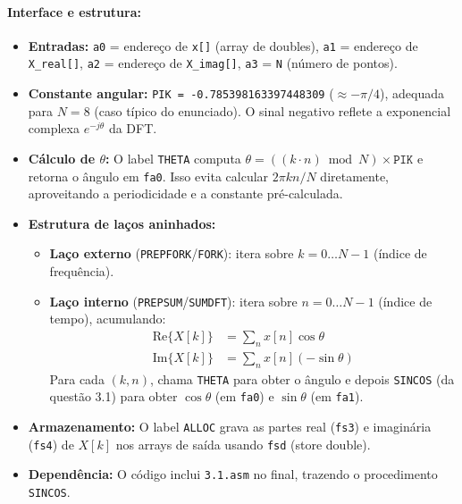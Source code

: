 \documentclass[12pt,a4paper]{article}
\begin{document}
\paragraph{Interface e estrutura:}
\begin{itemize}
  \item \textbf{Entradas:} \texttt{a0} = endereço de \texttt{x[]} (array de doubles), \texttt{a1} = endereço de \texttt{X\_real[]}, \texttt{a2} = endereço de \texttt{X\_imag[]}, \texttt{a3} = \texttt{N} (número de pontos).
  \item \textbf{Constante angular:} \texttt{PIK = -0.785398163397448309} ($\approx -\pi/4$), adequada para $N=8$ (caso típico do enunciado). O sinal negativo reflete a exponencial complexa $e^{-j\theta}$ da DFT.
  \item \textbf{Cálculo de $\theta$:} O label \texttt{THETA} computa $\theta = ((k \cdot n) \bmod N) \times \texttt{PIK}$ e retorna o ângulo em \texttt{fa0}. Isso evita calcular $2\pi k n / N$ diretamente, aproveitando a periodicidade e a constante pré-calculada.
  \item \textbf{Estrutura de laços aninhados:}
    \begin{itemize}
      \item \textbf{Laço externo} (\texttt{PREPFORK}/\texttt{FORK}): itera sobre $k = 0 \dots N-1$ (índice de frequência).
      \item \textbf{Laço interno} (\texttt{PREPSUM}/\texttt{SUMDFT}): itera sobre $n = 0 \dots N-1$ (índice de tempo), acumulando:
      \begin{align*}
        \text{Re}\{X[k]\} &= \sum_{n} x[n] \cos\theta \\
        \text{Im}\{X[k]\} &= \sum_{n} x[n] (-\sin\theta)
      \end{align*}
      Para cada $(k,n)$, chama \texttt{THETA} para obter o ângulo e depois \texttt{SINCOS} (da questão 3.1) para obter $\cos\theta$ (em \texttt{fa0}) e $\sin\theta$ (em \texttt{fa1}).
    \end{itemize}
  \item \textbf{Armazenamento:} O label \texttt{ALLOC} grava as partes real (\texttt{fs3}) e imaginária (\texttt{fs4}) de $X[k]$ nos arrays de saída usando \texttt{fsd} (store double).
  \item \textbf{Dependência:} O código inclui \texttt{3.1.asm} no final, trazendo o procedimento \texttt{SINCOS}.
\end{itemize}
\end{document}

